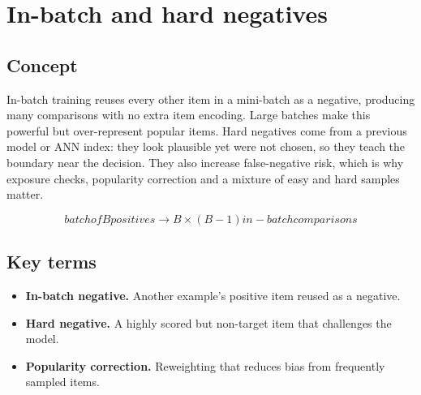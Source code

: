 \section{In-batch and hard negatives}

\begin{abstract}
Efficient negatives make training scalable; informative negatives make it discriminative.
\end{abstract}

\subsection{Concept}
In-batch training reuses every other item in a mini-batch as a negative, producing many comparisons with no extra item encoding. Large batches make this powerful but over-represent popular items. Hard negatives come from a previous model or ANN index: they look plausible yet were not chosen, so they teach the boundary near the decision. They also increase false-negative risk, which is why exposure checks, popularity correction and a mixture of easy and hard samples matter.

\begin{equation*}
batch of B positives  \rightarrow  B × (B-1) in-batch comparisons
\end{equation*}

\subsection{Key terms}
\begin{itemize}
\item \textbf{In-batch negative.} Another example’s positive item reused as a negative.
\item \textbf{Hard negative.} A highly scored but non-target item that challenges the model.
\item \textbf{Popularity correction.} Reweighting that reduces bias from frequently sampled items.
\end{itemize}
